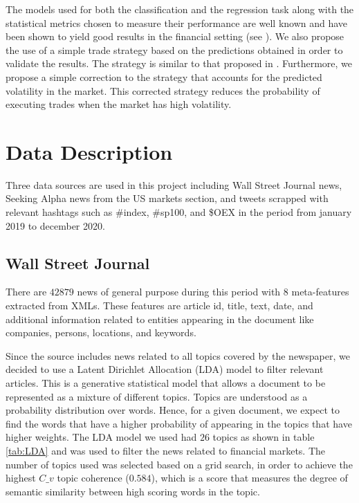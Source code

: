 \documentclass[a4paper, 12pt]{report}
\begin{document}
    The models used for both the classification and the regression task along with the statistical metrics chosen to measure their performance are well known and have been shown to yield good results in the financial setting (see \textcite{Fisher:2016}). We also propose the use of a simple trade strategy based on the predictions obtained in order to validate the results. The strategy is similar to that proposed in \textcite{Engelberg:2012}. Furthermore, we propose a simple correction to the strategy that accounts for the predicted volatility in the market. This corrected strategy reduces the probability of executing trades when the market has high volatility.   
    
    
    
    \chapter{Data Description}
    Three data sources are used in this project including Wall Street Journal news, Seeking Alpha news from the US markets section, and tweets scrapped with relevant hashtags such as {\#}index, {\#}sp100, and {\$}OEX in the period from january 2019 to december 2020.

    \section{Wall Street Journal}
    There are $42879$ news of general purpose during this period with $8$ meta-features extracted from XMLs. These features are  article id, title, text, date, and additional information related to entities appearing in the document like companies, persons, locations, and keywords.
    
    Since the source includes news related to all topics covered by the newspaper, we decided to use a Latent Dirichlet Allocation (LDA) model to filter relevant articles. This is a generative statistical model that allows a document to be represented as a mixture of different topics. Topics are understood as a probability distribution over words. Hence, for a given document, we expect to find the words that have a higher probability of appearing in the topics that have higher weights. The LDA model we used had $26$ topics as shown in table \ref{tab:LDA} and was used to filter the news related to financial markets. The number of topics used was selected based on a grid search, in order to achieve the highest $C\_v$ topic coherence ($0.584$), which is a score that measures the degree of semantic similarity between high scoring words in the topic.
    
\end{document}
